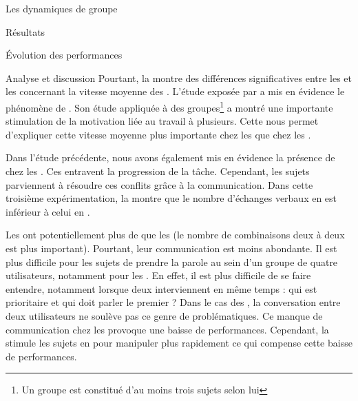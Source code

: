 \documentclass[myfrancais]{mythesis}
\begin{document}
\begin{mychapter}{Les dynamiques de groupe}
\begin{mysection}{Résultats}
\begin{mysubsection}{Évolution des performances}
\begin{mysubsubsection}{Analyse et discussion}
					Pourtant, la  montre des différences significatives entre les  et les  concernant la vitesse moyenne des .
					L'étude exposée par  a mis en évidence le phénomène de .
					Son étude appliquée à des groupes\footnote{Un groupe est constitué d'au moins trois sujets selon lui} a montré une importante stimulation de la motivation liée au travail à plusieurs.
					Cette  nous permet d'expliquer cette vitesse moyenne plus importante chez les  que chez les .

					Dans l'étude précédente, nous avons également mis en évidence la présence de  chez les .
					Ces  entravent la progression de la tâche.
					Cependant, les sujets parviennent à résoudre ces conflits grâce à la communication.
					Dans cette troisième expérimentation, la  montre que le nombre d'échanges verbaux en  est inférieur à celui en .

					Les  ont potentiellement plus de  que les  (le nombre de combinaisons deux à deux est plus important).
					Pourtant, leur communication est moins abondante.
					Il est plus difficile pour les sujets de prendre la parole au sein d'un groupe de quatre utilisateurs, notamment pour les .
					En effet, il est plus difficile de se faire entendre, notamment lorsque deux  interviennent en même temps : qui est prioritaire et qui doit parler le premier ?
					Dans le cas des , la conversation entre deux utilisateurs ne soulève pas ce genre de problématiques.
					Ce manque de communication chez les  provoque une baisse de performances.
					Cependant, la  stimule les sujets en  pour manipuler plus rapidement ce qui compense cette baisse de performances.


\end{mysubsubsection}
\end{mysubsection}
\end{mysection}
\end{mychapter}
\end{document}
